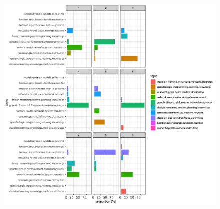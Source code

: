 \documentclass{article}
\begin{document}
\begin{figure}[H]
    \includegraphics[width=1\textwidth]{Fig4}
\end{figure}
\end{document}
